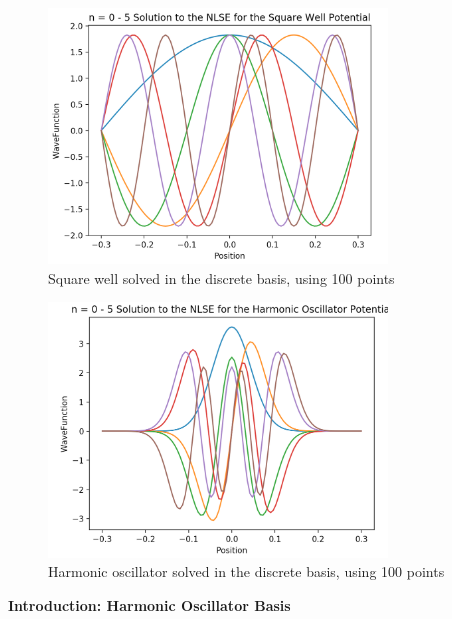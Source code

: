 \documentclass[%
 reprint,
 amsmath,amssymb,
 aps,
]{revtex4-1}
\begin{document}
\begin{figure}
\includegraphics[width=9cm]{DiscreteBasisSquareWell}
\caption{Square well solved in the discrete basis, using 100 points}
\end{figure}
\begin{figure}
\includegraphics[width=9cm]{DiscreteBasisHarmonicOscillator}
\caption{Harmonic oscillator solved in the discrete basis, using 100 points}
\end{figure}

\pagebreak

\noindent \textbf{Introduction: Harmonic Oscillator Basis}\\
\end{document}
